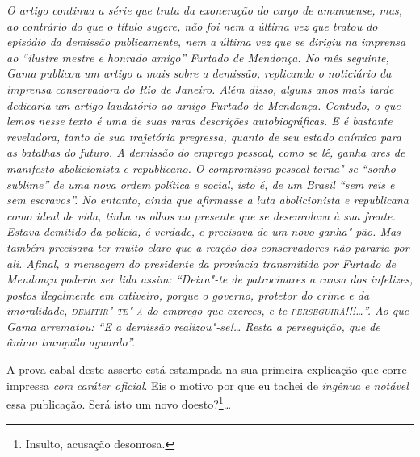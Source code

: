 \begin{flushleft}
{\footnotesize\itshape
O artigo continua a série que trata da exoneração do cargo de
amanuense, mas, ao contrário do que o título sugere, não foi nem a
última vez que tratou do episódio da demissão publicamente, nem a última
vez que se dirigiu na imprensa ao ``ilustre mestre e honrado amigo''
Furtado de Mendonça. No mês seguinte, Gama publicou um artigo a mais
sobre a demissão, replicando o noticiário da imprensa conservadora do
Rio de Janeiro. Além disso, alguns anos mais tarde dedicaria um artigo
laudatório ao amigo Furtado de Mendonça. Contudo, o que lemos nesse texto é uma de
suas raras descrições autobiográficas. E é bastante reveladora, tanto de
sua trajetória pregressa, quanto de seu estado anímico para as batalhas
do futuro. A demissão do emprego pessoal, como se lê, ganha ares de
manifesto abolicionista e republicano. O compromisso pessoal torna"-se
``sonho sublime'' de uma nova ordem política e social, isto é, de um
Brasil ``sem reis e sem escravos''. No entanto, ainda que afirmasse a luta
abolicionista e republicana como ideal de vida, tinha os olhos no
presente que se desenrolava à sua frente. Estava demitido da polícia, é
verdade, e precisava de um novo ganha"-pão. Mas
também precisava ter muito claro que a reação dos conservadores não
pararia por ali. Afinal, a
mensagem do presidente da província transmitida por Furtado de Mendonça
poderia ser lida assim: ``Deixa"-te de patrocinares a causa dos infelizes,
postos ilegalmente em cativeiro, porque o governo, protetor do crime e
da imoralidade, \textsc{demitir"-te"-á} do emprego que exerces, e te
\textsc{perseguirá}!!!\ldots{}''. Ao que Gama arrematou: ``E a demissão realizou"-se!\ldots{} Resta a perseguição, que de ânimo tranquilo aguardo''.}
\end{flushleft}


A prova cabal deste asserto está estampada na sua primeira explicação
que corre impressa \emph{com} \emph{caráter oficial}. Eis o motivo por
que eu tachei de \emph{ingênua e notável} essa publicação. Será isto um
novo doesto?\footnote{Insulto, acusação desonrosa.}\ldots{}

